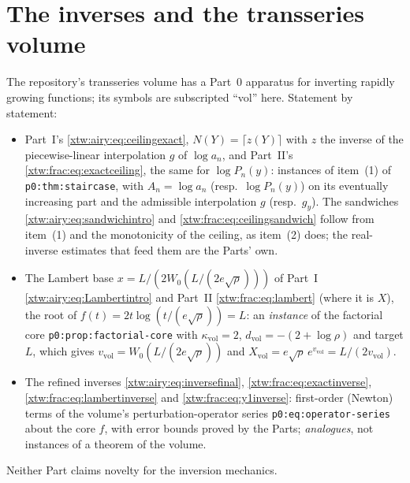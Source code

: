 \documentclass[11pt]{article}
\theoremstyle{remark}\newtheorem{remark}[theorem]{Remark}
\newcommand{\file}[1]{\nolinkurl{#1}}
\newcommand{\vol}{\mathrm{vol}}
\begin{document}
\section*{The inverses and the transseries volume}\label{xtw:sec:inverses}
The repository's transseries volume \cite{tsvol} has a Part~0 apparatus for
inverting rapidly growing functions; its symbols are subscripted ``vol''
here. Statement by statement:
\begin{itemize}
\item Part~I's \eqref{xtw:airy:eq:ceilingexact}, $N(Y)=\lceil z(Y)\rceil$ with
$z$ the inverse of the piecewise-linear interpolation $g$ of $\log a_n$, and
Part~II's \eqref{xtw:frac:eq:exactceiling}, the same for $\log P_n(y)$: instances
of item~(1) of \file{p0:thm:staircase}, with $A_n=\log a_n$ (resp.\ $\log
P_n(y)$) on its eventually increasing part and the admissible interpolation
$g$ (resp.\ $g_y$). The sandwiches \eqref{xtw:airy:eq:sandwichintro} and
\eqref{xtw:frac:eq:ceilingsandwich} follow from item~(1) and the monotonicity
of the ceiling, as item~(2) does; the real-inverse estimates that feed them
are the Parts' own.
\item The Lambert base $x=L/(2W_0(L/(2e\sqrt\rho)))$ of Part~I
\eqref{xtw:airy:eq:Lambertintro} and Part~II \eqref{xtw:frac:eq:lambert} (where it
is $X$), the root of $f(t)=2t\log(t/(e\sqrt\rho))=L$: an \emph{instance} of
the factorial core \file{p0:prop:factorial-core} with $\kappa_\vol=2$,
$d_\vol=-(2+\log\rho)$ and target $L$, which gives
$v_\vol=W_0(L/(2e\sqrt\rho))$ and $X_\vol=e\sqrt\rho\,e^{v_\vol}=L/(2v_\vol)$.
\item The refined inverses \eqref{xtw:airy:eq:inversefinal},
\eqref{xtw:frac:eq:exactinverse}, \eqref{xtw:frac:eq:lambertinverse} and
\eqref{xtw:frac:eq:y1inverse}: first-order (Newton) terms of the volume's
perturbation-operator series \file{p0:eq:operator-series} about the core $f$,
with error bounds proved by the Parts; \emph{analogues}, not instances of a
theorem of the volume.
\end{itemize}
Neither Part claims novelty for the inversion mechanics.
\end{document}
